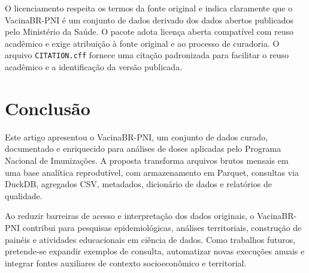 \documentclass[12pt]{article}
\begin{document}
O licenciamento respeita os termos da fonte original e indica claramente que o VacinaBR-PNI é um conjunto de dados derivado dos dados abertos publicados pelo Ministério da Saúde. O pacote adota licença aberta compatível com reuso acadêmico e exige atribuição à fonte original e ao processo de curadoria. O arquivo \texttt{CITATION.cff} fornece uma citação padronizada para facilitar o reuso acadêmico e a identificação da versão publicada.

\section{Conclusão}

Este artigo apresentou o VacinaBR-PNI, um conjunto de dados curado, documentado e enriquecido para análises de doses aplicadas pelo Programa Nacional de Imunizações. A proposta transforma arquivos brutos mensais em uma base analítica reprodutível, com armazenamento em Parquet, consultas via DuckDB, agregados CSV, metadados, dicionário de dados e relatórios de qualidade.

Ao reduzir barreiras de acesso e interpretação dos dados originais, o VacinaBR-PNI contribui para pesquisas epidemiológicas, análises territoriais, construção de painéis e atividades educacionais em ciência de dados. Como trabalhos futuros, pretende-se expandir exemplos de consulta, automatizar novas execuções anuais e integrar fontes auxiliares de contexto socioeconômico e territorial.



\end{document}
